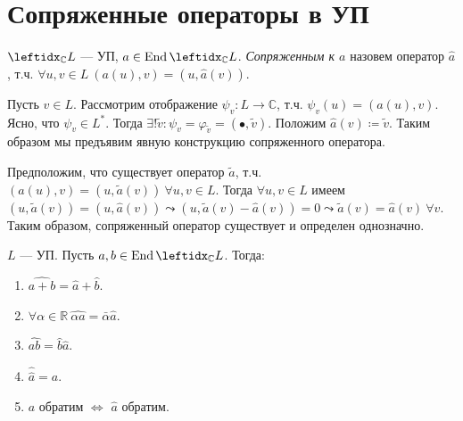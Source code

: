 \section{Сопряженные операторы в УП}

\begin{defn}
    $\lsub{\mathbb{C}}{L}$ --- УП, $a \in \End \lsub{\mathbb{C}}{L}$. \textit{Сопряженным к $a$} назовем оператор $\hat{a}$, т.ч. $\forall u, v \in L\ (a(u), v) = (u, \hat{a}(v))$.
\end{defn}

\begin{rem}
    Пусть $v \in L$. Рассмотрим отображение $\psi_v \colon L \to \mathbb{C}$, т.ч. $\psi_v(u) = (a(u), v)$. Ясно, что $\psi_v \in L^*$. Тогда $\exists! \tilde{v} \colon \psi_v = \varphi_{\tilde{v}} = (\bullet, \tilde{v})$. Положим $\hat{a}(v) \coloneqq \tilde{v}$. Таким образом мы предъявим явную конструкцию сопряженного оператора.
    
    Предположим, что существует оператор $\tilde{a}$, т.ч. $(a(u), v) = (u, \tilde{a}(v))\ \forall u, v \in L$. Тогда $\forall u, v \in L$ имеем $(u, \tilde{a}(v)) = (u, \hat{a}(v)) \leadsto (u, \tilde{a}(v) - \hat{a}(v)) = 0 \leadsto \tilde{a}(v) = \hat{a}(v)\ \forall v$. Таким образом, сопряженный оператор существует и определен однозначно.
\end{rem}

\begin{thm}
    $L$ --- УП. Пусть $a, b \in \End \lsub{\mathbb{C}}{L}$. Тогда:
    \begin{enumerate}
        \item $\widehat{a + b} = \hat{a} + \hat{b}$.
        \item $\forall \alpha \in \mathbb{R}\ \widehat{\alpha a} = \bar{\alpha} \hat{a}$.
        \item $\widehat{ab} = \hat{b} \hat{a}$.
        \item $\hat{\hat{a}} = a$.
        \item $a$ обратим $\Leftrightarrow$ $\hat{a}$ обратим.
    \end{enumerate}
\end{thm}

